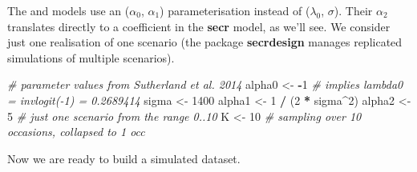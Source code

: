 \documentclass[
]{book}
\newenvironment{Shaded}{\begin{snugshade}}{\end{snugshade}}
\newcommand{\AttributeTok}[1]{\textcolor[rgb]{0.13,0.29,0.53}{#1}}
\newcommand{\CommentTok}[1]{\textcolor[rgb]{0.56,0.35,0.01}{\textit{#1}}}
\newcommand{\DecValTok}[1]{\textcolor[rgb]{0.00,0.00,0.81}{#1}}
\newcommand{\FunctionTok}[1]{\textcolor[rgb]{0.13,0.29,0.53}{\textbf{#1}}}
\newcommand{\NormalTok}[1]{#1}
\newcommand{\OtherTok}[1]{\textcolor[rgb]{0.56,0.35,0.01}{#1}}
\newcommand{\SpecialCharTok}[1]{\textcolor[rgb]{0.81,0.36,0.00}{\textbf{#1}}}
\newcommand{\StringTok}[1]{\textcolor[rgb]{0.31,0.60,0.02}{#1}}
\begin{document}
The \citet{rcgg13} and \citet{sfr15} models use an (\(\alpha_0\), \(\alpha_1\)) parameterisation instead of (\(\lambda_0\), \(\sigma\)). Their \(\alpha_2\) translates directly to a coefficient in the \textbf{secr} model, as we'll see. We consider just one realisation of one scenario (the package \textbf{secrdesign} \citet{R-secrdesign} manages replicated simulations of multiple scenarios).

\begin{Shaded}
\begin{Highlighting}[]
\CommentTok{\# parameter values from Sutherland et al. 2014}
\NormalTok{alpha0 }\OtherTok{\textless{}{-}} \SpecialCharTok{{-}}\DecValTok{1}   \CommentTok{\# implies lambda0 = invlogit({-}1) = 0.2689414}
\NormalTok{sigma }\OtherTok{\textless{}{-}} \DecValTok{1400}
\NormalTok{alpha1 }\OtherTok{\textless{}{-}} \DecValTok{1} \SpecialCharTok{/}\NormalTok{ (}\DecValTok{2} \SpecialCharTok{*}\NormalTok{ sigma}\SpecialCharTok{\^{}}\DecValTok{2}\NormalTok{)}
\NormalTok{alpha2 }\OtherTok{\textless{}{-}} \DecValTok{5}    \CommentTok{\# just one scenario from the range 0..10}
\NormalTok{K  }\OtherTok{\textless{}{-}} \DecValTok{10}       \CommentTok{\# sampling over 10 occasions, collapsed to 1 occ}
\end{Highlighting}
\end{Shaded}

Now we are ready to build a simulated dataset.

\begin{Shaded}
\end{Shaded}
\end{document}
